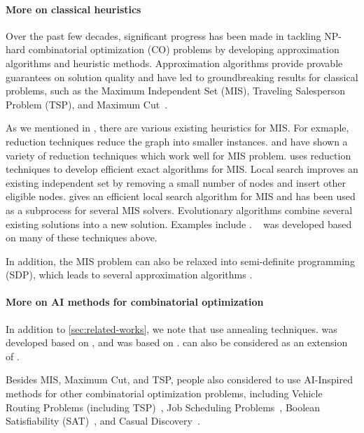 \paragraph{More on classical heuristics}
Over the past few decades, significant progress has been made in tackling NP-hard combinatorial optimization (CO) problems by developing approximation algorithms and heuristic methods. Approximation algorithms provide provable guarantees on solution quality and have led to groundbreaking results for classical problems, such as the Maximum Independent Set (MIS), Traveling Salesperson Problem (TSP), and Maximum Cut~\citep{boppana1992approximating, laporte1992traveling, goemans1995improved}.

As we mentioned in , there are various existing heuristics for MIS. For exmaple, reduction techniques reduce the graph into smaller instances. \citet{akiba2016branch} and \citet{xiao2013confining} have shown a variety of reduction techniques which work well for MIS problem. \citet{butenko2002finding, bourgeois2012fast} uses reduction techniques to develop efficient exact algorithms for MIS. Local search improves an existing independent set by removing a small number of nodes and insert other eligible nodes. \citet{andrade2012fast} gives an efficient local search algorithm for MIS and has been used as a subprocess for several MIS solvers. Evolutionary algorithms combine several existing solutions into a new solution. Examples include \citet{back1994evolutionary, borisovsky2003experimental, lamm2015graph}. \kamis~\citep{lamm2017finding, dahlum2016accelerating} was developed based on many of these techniques above.

In addition, the MIS problem can also be relaxed into semi-definite programming (SDP), which leads to several approximation algorithms \citep{halperin2002improved, bansal2014approximating}.

\paragraph{More on AI methods for combinatorial optimization} 
In addition to \cref{sec:related-works}, we note that \citet{sun2022annealed, sanokowski2023variational, sanokowskidiffusion} use annealing techniques. \citet{sun2023difusco} was developed based on \citet{qiu2022dimes}, and \citet{sanokowskidiffusion} was based on \citet{sanokowski2023variational}. \citet{sanokowskidiffusion} can also be considered as an extension of \citet{karalias2020erdos}.


Besides MIS, Maximum Cut, and TSP, people also considered to use AI-Inspired methods for other combinatorial optimization problems, including Vehicle Routing Problems (including TSP)~\citep{kool2018attention, chen2019learning, delarue2020reinforcement, li2021deep, zheng2021combining, ye2024deepaco}, Job Scheduling Problems~\citep{lin2019smart, baer2019multi, zhang2020learning, ye2024deepaco}, Boolean Satisfiability (SAT)~\citep{amizadeh2019learning, you2019g2sat, kurin2020can, li2022nsnet, li2023hardsatgen}, and Casual Discovery~\citep{zheng2018dags, zhu2020causal, sanchez2022diffusion}.
